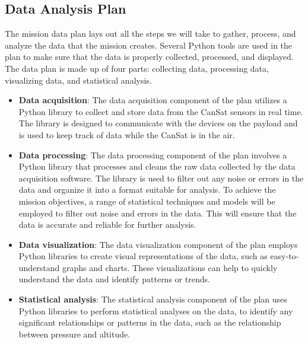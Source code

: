 \subsection{Data Analysis Plan}

The mission data plan lays out all the steps we will take to gather, process, and analyze the data that the mission creates. Several Python tools are used in the plan to make sure that the data is properly collected, processed, and displayed. The data plan is made up of four parts: collecting data, processing data, visualizing data, and statistical analysis.


\begin{itemize}[leftmargin=1cm,itemindent=0.5cm, noitemsep, topsep=0pt]
    \item \textbf{Data acquisition}: The data acquisition component of the plan utilizes a Python library to collect and store data from the CanSat sensors in real time. The library is designed to communicate with the devices on the payload and is used to keep track of data while the CanSat is in the air.
    \item \textbf{Data processing}: The data processing component of the plan involves a Python library that processes and cleans the raw data collected by the data acquisition software. The library is used to filter out any noise or errors in the data and organize it into a format suitable for analysis. To achieve the mission objectives, a range of statistical techniques and models will be employed to filter out noise and errors in the data. This will ensure that the data is accurate and reliable for further analysis.
    \item \textbf{Data visualization}: The data visualization component of the plan employs Python libraries to create visual representations of the data, such as easy-to-understand graphs and charts. These visualizations can help to quickly understand the data and identify patterns or trends.
    \item \textbf{Statistical analysis}: The statistical analysis component of the plan uses Python libraries to perform statistical analyses on the data, to identify any significant relationships or patterns in the data, such as the relationship between pressure and altitude. 
\end{itemize}


